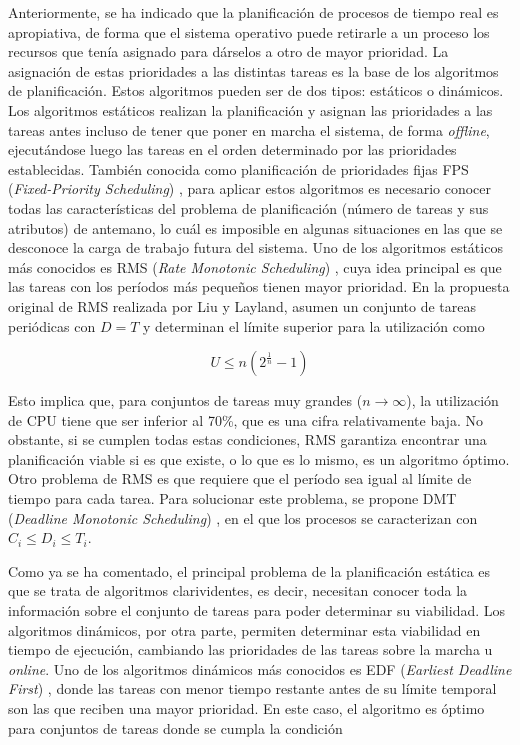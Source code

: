 Anteriormente, se ha indicado que la planificación de procesos de tiempo real es
apropiativa, de forma que el sistema operativo puede retirarle a un proceso los
recursos que tenía asignado para dárselos a otro de mayor prioridad. La
asignación de estas prioridades a las distintas tareas es la base de los
algoritmos de planificación. Estos algoritmos pueden ser de dos tipos: estáticos
o dinámicos. Los algoritmos estáticos realizan la planificación y asignan las
prioridades a las tareas antes incluso de tener que poner en marcha el sistema,
de forma \textit{offline}, ejecutándose luego las tareas en el orden determinado
por las prioridades establecidas. También conocida como planificación de
prioridades fijas FPS (\textit{Fixed-Priority Scheduling})
\cite{tilborg_fixed_1991}, para aplicar estos algoritmos es necesario conocer
todas las características del problema de planificación (número de tareas y sus
atributos) de antemano, lo cuál es imposible en algunas situaciones en las que
se desconoce la carga de trabajo futura del sistema. Uno de los algoritmos
estáticos más conocidos es RMS (\textit{Rate Monotonic Scheduling})
\cite{liu_scheduling_1973}\cite{kao_rate-monotonic_2008}, cuya idea principal es
que las tareas con los períodos más pequeños tienen mayor prioridad. En la
propuesta original de RMS realizada por Liu y Layland, asumen un conjunto de
tareas periódicas con $D=T$ y determinan el límite superior para la utilización
como

\begin{equation}
  U \leq n(2^{\frac{1}{n}} - 1)
\end{equation}

Esto implica que, para conjuntos de tareas muy grandes ($n \rightarrow \infty$),
la utilización de CPU tiene que ser inferior al 70\%, que es una cifra
relativamente baja. No obstante, si se cumplen todas estas condiciones, RMS
garantiza encontrar una planificación viable si es que existe, o lo que es lo
mismo, es un algoritmo óptimo. Otro problema de RMS es que requiere que el
período sea igual al límite de tiempo para cada tarea. Para solucionar este
problema, se propone DMT (\textit{Deadline Monotonic Scheduling})
\cite{audsley_hard_1991}, en el que los procesos se caracterizan con $C_{i} \leq
  D_{i} \leq T_{i}$.

Como ya se ha comentado, el principal problema de la planificación estática es
que se trata de algoritmos clarividentes, es decir, necesitan conocer toda la
información sobre el conjunto de tareas para poder determinar su viabilidad. Los
algoritmos dinámicos, por otra parte, permiten determinar esta viabilidad
en tiempo de ejecución, cambiando las prioridades de las tareas sobre la marcha
u \textit{online}. Uno de los algoritmos dinámicos más conocidos es EDF
(\textit{Earliest Deadline First}) \cite{liu_scheduling_1973}, donde las tareas
con menor tiempo restante antes de su límite temporal son las que reciben una
mayor prioridad. En este caso, el algoritmo es óptimo para conjuntos de tareas
donde se cumpla la condición \cite{zhang_schedulability_2009}

